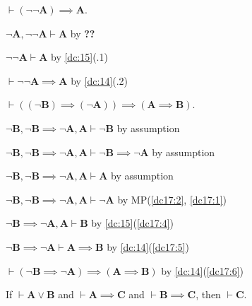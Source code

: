 \documentclass{amsart}%
\newcommand\metavariable[1]{\boldsymbol{#1}}
\begin{document}
\begin{dc}\label{dc:16}
$\vdash(\neg\neg\metavariable{A})\implies\metavariable{A}$.
\end{dc}

\begin{pf}
\item $\neg\metavariable{A},\neg\neg\metavariable{A}\vdash\metavariable{A}$
  by \textbf{??}
\item $\neg\neg\metavariable{A}\vdash\metavariable{A}$ by \ref{dc:15}(.1)
\item $\vdash\neg\neg\metavariable{A}\implies\metavariable{A}$ by \ref{dc:14}(.2)
\end{pf}

\begin{dc}\label{dc:17}
$\vdash((\neg\metavariable{B})\implies(\neg\metavariable{A}))\implies(\metavariable{A}\implies\metavariable{B})$.
\end{dc}

\begin{pf}
\item\label{dc17:1} $\neg\metavariable{B},\neg\metavariable{B}\implies\neg\metavariable{A},\metavariable{A}\vdash\neg\metavariable{B}$
by assumption
\item\label{dc17:2} $\neg\metavariable{B},\neg\metavariable{B}\implies\neg\metavariable{A},\metavariable{A}\vdash\neg\metavariable{B}\implies\neg\metavariable{A}$
by assumption
\item\label{dc17:3} $\neg\metavariable{B},\neg\metavariable{B}\implies\neg\metavariable{A},\metavariable{A}\vdash\metavariable{A}$
by assumption
\item\label{dc17:4} $\neg\metavariable{B},\neg\metavariable{B}\implies\neg\metavariable{A},\metavariable{A}\vdash\neg\metavariable{A}$ by MP(\ref{dc17:2}, \ref{dc17:1})
\item\label{dc17:5} $\neg\metavariable{B}\implies\neg\metavariable{A},\metavariable{A}\vdash\metavariable{B}$ by \ref{dc:15}(\ref{dc17:4})
\item\label{dc17:6} $\neg\metavariable{B}\implies\neg\metavariable{A}\vdash\metavariable{A}\implies\metavariable{B}$ by \ref{dc:14}(\ref{dc17:5})
\item\label{dc17:7} $\vdash(\neg\metavariable{B}\implies\neg\metavariable{A})\implies(\metavariable{A}\implies\metavariable{B})$ by \ref{dc:14}(\ref{dc17:6})
\end{pf}

\begin{dc}\label{dc:18}
If $\vdash\metavariable{A}\lor\metavariable{B}$
and $\vdash\metavariable{A}\implies\metavariable{C}$
and $\vdash\metavariable{B}\implies\metavariable{C}$,
then $\vdash\metavariable{C}$.
\end{dc}
\end{document}
